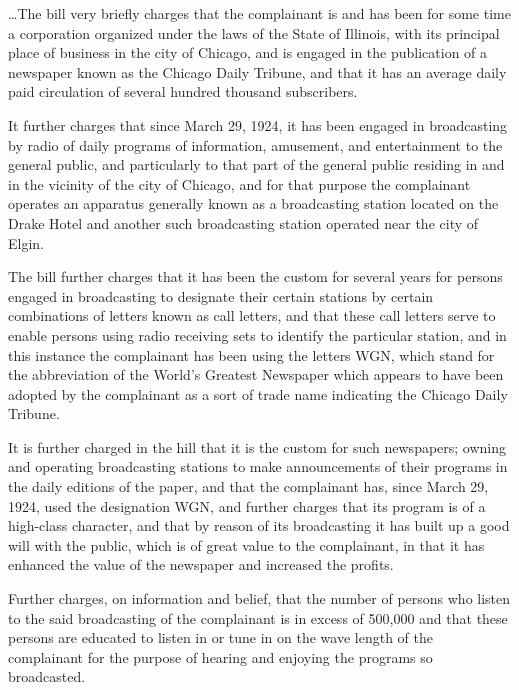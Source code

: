 


\ldots The bill very briefly charges that the complainant is and has been for
some time a corporation organized under the laws of the State of Illinois, with
its principal place of business in the city of Chicago, and is engaged in the
publication of a newspaper known as the Chicago Daily Tribune, and that it has
an average daily paid circulation of several hundred thousand subscribers.

It further charges that since March 29, 1924, it has been engaged in
broadcasting by radio of daily programs of information, amusement, and
entertainment to the general public, and particularly to that part of the
general public residing in and in the vicinity of the city of Chicago, and for
that purpose the complainant operates an apparatus generally
known as a broadcasting station located on the Drake Hotel and another such
broadcasting station operated near the city of Elgin.

The bill further charges that it has been the custom for several years for
persons engaged in broadcasting to designate their certain stations by certain
combinations of letters known as call letters, and that these call letters
serve to enable persons using radio receiving sets to identify the particular
station, and in this instance the complainant has been using the letters WGN,
which stand for the abbreviation of the World's Greatest Newspaper which
appears to have been adopted by the complainant as a sort of trade name
indicating the Chicago Daily Tribune.

It is further charged in the hill that it is the custom for such newspapers;
owning and operating broadcasting stations to make announcements of their
programs in the daily editions of the paper, and that the complainant has,
since March 29, 1924, used the designation WGN, and further charges that its
program is of a high-class character, and that by reason of its broadcasting it
has built up a good will with the public, which is of great value to the
complainant, in that it has enhanced the value of the newspaper and increased
the profits.

Further charges, on information and belief, that the number of persons who
listen to the said broadcasting of the complainant is in excess of 500,000 and
that these persons are educated to listen in or tune in on the wave
length of the complainant for the purpose of hearing and
enjoying the programs so broadcasted.

